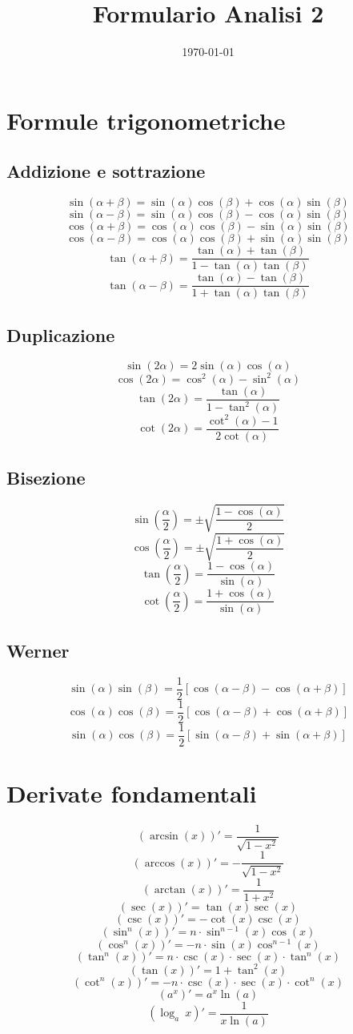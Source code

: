 \documentclass[a4paper,portrait,columns=3,5pt]{cheatsheet}
\title{Formulario Analisi 2}
\author{}
\date{\today}
\begin{document}

\section{Formule trigonometriche}
\subsection{Addizione e sottrazione}
$$\sin (\alpha + \beta) = \sin(\alpha) \cos(\beta) + \cos(\alpha)\sin(\beta)$$
$$\sin(\alpha - \beta) = \sin(\alpha) \cos(\beta) - \cos(\alpha)\sin(\beta)$$
$$\cos(\alpha + \beta) = \cos(\alpha) \cos(\beta) - \sin(\alpha) \sin(\beta)$$
$$\cos(\alpha - \beta) = \cos(\alpha) \cos(\beta) + \sin(\alpha) \sin(\beta)$$
$$\tan(\alpha + \beta) = \frac{\tan(\alpha) + \tan(\beta)}{1 - \tan(\alpha)\tan(\beta)}$$
$$\tan(\alpha - \beta) = \frac{\tan(\alpha) - \tan(\beta)}{1 + \tan(\alpha)\tan(\beta)}$$
\subsection{Duplicazione}
$$\sin(2\alpha) = 2\sin(\alpha)\cos(\alpha)$$
$$\cos(2\alpha) = \cos^2 (\alpha) - \sin^2 (\alpha)$$
$$\tan(2\alpha) = \frac{\tan(\alpha)}{1 - \tan^2(\alpha)}$$
$$\cot(2\alpha) = \frac{\cot^2(\alpha) - 1}{2\cot(\alpha)}$$
\subsection{Bisezione}
$$\sin\left(\frac{\alpha}{2}\right) = \pm \sqrt{\frac{1 - \cos(\alpha)}{2}}$$
$$\cos\left(\frac{\alpha}{2}\right) = \pm \sqrt{\frac{1 + \cos(\alpha)}{2}}$$
$$\tan\left(\frac{\alpha}{2}\right) = {\frac{1 - \cos(\alpha)}{\sin(\alpha)}}$$
$$\cot\left(\frac{\alpha}{2}\right) = {\frac{1 + \cos(\alpha)}{\sin(\alpha)}}$$
\subsection{Werner}
$$\sin(\alpha)\sin(\beta) = \frac{1}{2} \left[\cos(\alpha - \beta) - \cos(\alpha + \beta)\right]$$
$$\cos(\alpha)\cos(\beta) = \frac{1}{2} \left[\cos(\alpha - \beta) + \cos(\alpha + \beta)\right]$$
$$\sin(\alpha)\cos(\beta) = \frac{1}{2} \left[\sin(\alpha - \beta) + \sin(\alpha + \beta)\right]$$

\section{Derivate fondamentali}
$$ (\arcsin(x))' = \frac{1}{\sqrt{1 - x^2}}$$
$$ (\arccos(x))' = - \frac{1}{\sqrt{1 - x^2}}$$
$$ (\arctan(x))' = \frac{1}{1 + x^2}$$
$$ (\sec(x))' = \tan(x)\sec(x)$$
$$ (\csc(x))' = -\cot(x)\csc(x)$$
$$ (\sin^n(x))' = n\cdot \sin^{n-1}(x)\cos(x)$$
$$ (\cos^n(x))' = -n\cdot \sin(x)\cos^{n-1}(x)$$
$$ (\tan^n(x))' = n \cdot \csc(x) \cdot \sec(x) \cdot \tan^n (x)$$
$$ (\tan(x))' = 1 + \tan^2(x) $$
$$ (\cot^n(x))' = - n \cdot \csc(x) \cdot \sec(x) \cdot \cot^n (x)$$
$$ (a^x)' = a^x \ln(a)$$
$$ (\log_a~x )' = \frac{1}{x\ln(a)}$$
\end{document}
